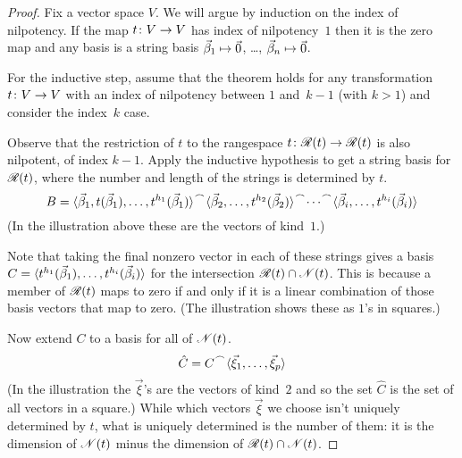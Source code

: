 \begin{proof}
Fix a vector space $V$. 
We will argue by induction on the index of nilpotency.
If the map $\mbox{$t\colon V\to V$}$
has index of nilpotency~\( 1 \) then it is the zero map and any basis 
is a string basis $\vec{\beta}_1\mapsto\vec{0}$, \ldots, 
$\vec{\beta}_n\mapsto\vec{0}$.

For the inductive step, assume that the theorem holds for any transformation
$\mbox{$t\colon V\to V$}$
with an index of nilpotency between $1$ and~\( k-1 \) (with $k>1$)
and consider the index~$k$ case.

Observe that the restriction of $t$ to
the rangespace
\( \mbox{$t\colon \mathscr{R}(t)\to \mathscr{R}(t)$} \) 
is also nilpotent, of index \( k-1 \).
Apply the inductive hypothesis to get a string basis for
\( \mathscr{R}(t) \),
where the number and length of the strings
is determined by \( t \).
\begin{equation*}
  B=\cat{\cat{\sequence{\vec{\beta}_1,t(\vec{\beta}_1),\dots,
     t^{h_1}(\vec{\beta}_1)}}{
  \cat{\sequence{\vec{\beta}_2,\ldots,t^{h_2}(\vec{\beta}_2)}}}{\cdots}}{
  \sequence{\vec{\beta}_i,\ldots,t^{h_i}(\vec{\beta}_i)} }
\end{equation*}
(In the illustration above these are the vectors of kind~\( 1 \).)

Note that taking the final nonzero vector in each 
of these strings
gives a basis
\( C=\langle t^{h_1}(\vec{\beta}_1),\dots,t^{h_i}(\vec{\beta}_i)\rangle \)
for the intersection \( \mathscr{R}(t)\cap\mathscr{N}(t) \).
This is because a member of \( \mathscr{R}(t) \) maps to zero if and only
if it is a linear combination of those basis vectors that map
to zero.
(The illustration shows these as \( 1 \)'s in squares.)

Now extend \( C \) to a basis for all of \( \mathscr{N}(t) \).
\begin{equation*}
  \hat{C}=\cat{C}{\sequence{\vec{\xi}_1,\dots,\vec{\xi}_p}}
\end{equation*}
(In the illustration the $\vec{\xi}$'s are the vectors of kind~\( 2 \) 
and so the set \( \hat{C} \) is the set of all vectors in a square.)
While which vectors \( \vec{\xi} \) we choose isn't uniquely
determined by $t$, what is uniquely determined is the number
of them: it is the dimension of
\( \mathscr{N}(t) \) minus the dimension of
\( \mathscr{R}(t)\cap\mathscr{N}(t) \).


\end{proof}
